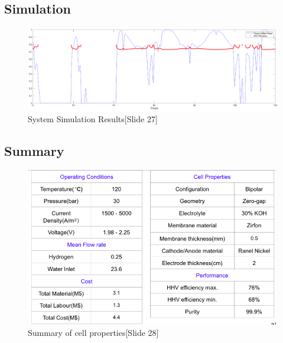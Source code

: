\subsection{Simulation}
\begin{figure}[H]
\centering
\includegraphics[width=1.0\textwidth]{simulation.eps}
\caption{System Simulation Results[Slide 27]} 
\end{figure} 

\subsection{Summary}
\begin{figure}[H]
\includegraphics[width=0.99\textwidth]{summary.png}
\caption{Summary of cell properties[Slide 28]}
\end{figure} 

